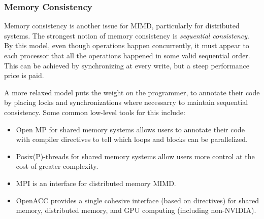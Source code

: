 \documentclass[12pt]{article}
\begin{document}
\subsubsection*{Memory Consistency}

Memory consistency is another issue for MIMD, particularly for distributed
systems.
The strongest notion of memory consistency is {\it sequential consistency}.
By this model, even though operations happen concurrently, it must appear to
each processor that all the operations happened in some valid sequential order.
This can be achieved by synchronizing at every write, but a steep performance
price is paid.

A more relaxed model puts the weight on the programmer, to annotate their code
by placing locks and synchronizations where necessarry to maintain sequential
consistency.
Some common low-level tools for this include:

\begin{itemize}
\item Open MP for shared memory systems allows users to annotate their code
with compiler directives to tell which loops and blocks can be parallelized.
\item Posix(P)-threads for shared memory systems allow users more control
at the cost of greater complexity.
\item MPI is an interface for distributed memory MIMD.
\item OpenACC provides a single cohesive interface (based on directives)
for shared memory, distributed memory, and GPU computing (including non-NVIDIA).
\end{itemize}
\end{document}

